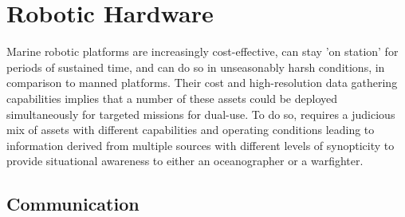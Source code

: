 \section{Robotic Hardware}
\label{sec:robots}



Marine robotic platforms are increasingly cost-effective, can stay 'on
station' for periods of sustained time, and can do so in unseasonably
harsh conditions, in comparison to manned platforms. Their cost and
high-resolution data gathering capabilities implies that a number of
these assets could be deployed simultaneously for targeted missions
for dual-use. To do so, requires a judicious mix of assets with
different capabilities and operating conditions leading to information
derived from multiple sources with different levels of synopticity to
provide situational awareness to either an oceanographer or a
warfighter.


\subsection{Communication}
\label{sec:comms}



